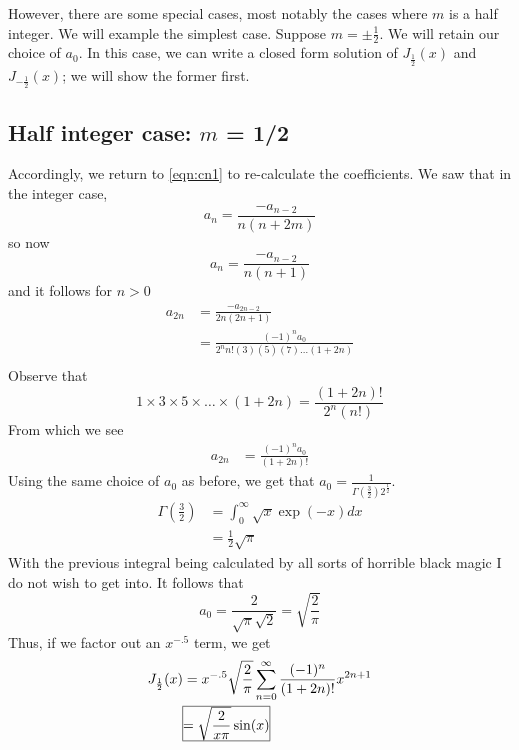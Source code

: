 \documentclass[]{article}
\begin{document}
 However, there are some special cases, most notably the cases where $m$ is a half integer. We will example the simplest case. Suppose $m = \pm \frac{1}{2}$. We will retain our choice of $a_0$. In this case, we can write a closed form solution of $J_{\frac{1}{2}}(x)$ and $J_{-\frac{1}{2}}(x)$; we will show the former first.
 
 \subsection{Half integer case: $m$ = 1/2}
  Accordingly, we return to \eqref{eqn:cn1} to re-calculate the coefficients. We saw that in the integer case, 
 \[a_n = \frac{-a_{n-2}}{n(n+2m)}\]
 so now
 \begin{equation} \label{eq:9}
 	a_n = \frac{-a_{n-2}}{n(n+1)}
 \end{equation}
 and it follows for $n > 0$
 \begin{align*}
 	a_{2n} &= \frac{-a_{2n-2}}{2n(2n+1)} \\
 		&= \frac{(-1)^na_0}{2^nn!
 		(3)(5)(7)\ldots(1+2n)}\\
 \end{align*}
 Observe that 
 \[
 1  \times 3 \times 5 \times \ldots \times (1+2n) = \frac{(1+2n)!}{2^n(n!)}
 \]
 From which we see
 \begin{align}
 		a_{2n} &= \frac{(-1)^na_0}{(1+2n)!}
 \end{align}
 Using the same choice of $a_0$ as before, we get that $a_0 = \frac{1}{\Gamma(\frac{3}{2})2^{\frac{1}{2}}}$.
 \begin{align*}
	 \Gamma(\frac{3}{2}) &= \int_{0}^{\infty}\sqrt{x}\exp(-x)dx\\
	 & = \frac{1}{2}\sqrt{\pi}
 \end{align*}
 With the previous integral being calculated by all sorts of horrible black magic I do not wish to get into. It follows that
 \[a_0 = \frac{2}{\sqrt{\pi}\sqrt{2}} = \sqrt{\frac{2}{\pi}} \]
Thus, if we factor out an $x^{-.5}$ term, we get 
\begin{align} 
	J_{\frac{1}{2}}(x) &=x^{-.5} \sqrt{\frac{2}{\pi}} \sum_{n=0}^{\infty}
	\frac{(-1)^n}{(1+2n)!}
	x^{2n+1}\\
	&\frame{$\displaystyle =	\sqrt{\frac{2}{x\pi}}\sin(x)$}
 \end{align}
\end{document}
